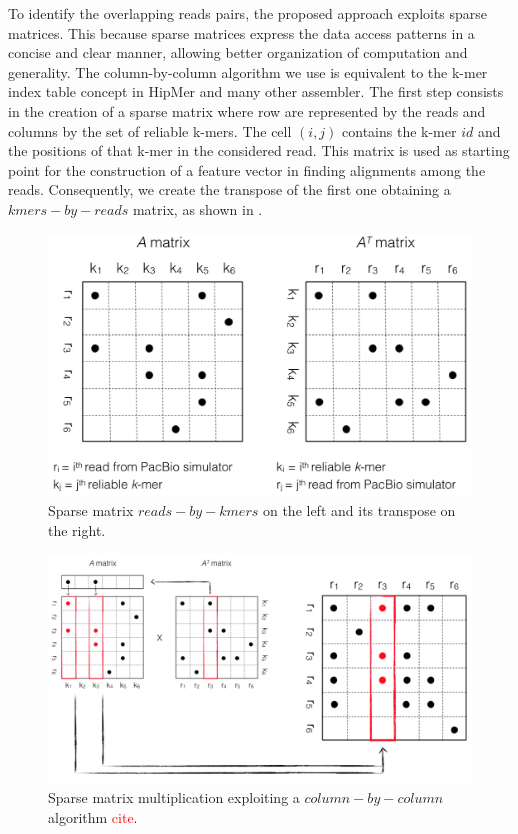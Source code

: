 \documentclass[11pt]{article}
\newcommand\myworries[1]{\textcolor{red}{#1}}
\begin{document}
To identify the overlapping reads pairs, the proposed approach exploits sparse matrices.
This because sparse matrices express the data access patterns in a concise and clear manner, allowing better organization of computation and generality.
The column-by-column algorithm we use is equivalent to the k-mer index table concept in HipMer and many other assembler. 
The first step consists in the creation of a sparse matrix where row are represented by the reads and columns by the set of reliable k-mers.
The cell $(i,j)$ contains the k-mer $id$ and the positions of that k-mer in the considered read.
This matrix is used as starting point for the construction of a feature vector in finding alignments among the reads.
Consequently, we create the transpose of the first one obtaining a $kmers-by-reads$ matrix, as shown in .
\begin{figure}
    \centering
    \includegraphics[width=\textwidth]{image/matrices.png}
    \caption{Sparse matrix $reads-by-kmers$ on the left and its transpose on the right.}
    \label{fig:matrices}
\end{figure}
\begin{figure}
    \centering
    \includegraphics[width=\textwidth]{image/mult.png}
    \caption{Sparse matrix multiplication exploiting a $column-by-column$ algorithm \myworries{cite}.}
    \label{fig:mult}
\end{figure}
\end{document}

